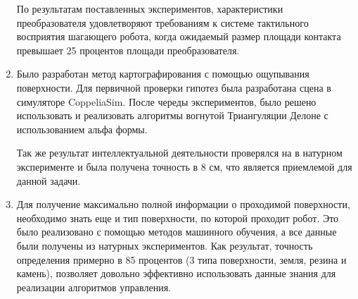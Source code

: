 \begin{enumerate}
  По результатам поставленных экспериментов, характеристики преобразователя удовлетворяют требованиям к системе тактильного восприятия шагающего робота, когда ожидаемый размер площади контакта превышает 25 процентов площади преобразователя.
  \item Было разработан метод картографирования с помощью ощупывания поверхности. Для первичной проверки гипотез была разработана сцена в симуляторе CoppeliaSim. После череды экспериментов, было решено использовать и реализовать алгоритмы вогнутой Триангуляции Делоне с использованием альфа формы.

  Так же результат интеллектуальной деятельности проверялся на в натурном эксперименте и была получена точность в 8 см, что является приемлемой для данной задачи.
  \item Для получение максимально полной информации о проходимой поверхности, необходимо знать еще и тип поверхности, по которой проходит робот. Это было реализовано с помощью методов машинного обучения, а все данные были получены из натурных экспериментов. Как результат, точность определения примерно в 85 процентов (3 типа поверхности, земля, резина и камень), позволяет довольно эффективно использовать данные знания для реализации алгоритмов управления.
\end{enumerate}